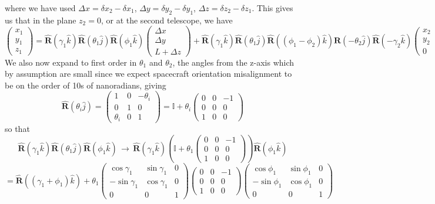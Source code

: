 \documentclass[11pt]{amsart}
\makeatletter
\newcommand{\op}[1]{\mathbf{\hat{#1}}}	%
\newcommand{\se}[1]{\mathbb{#1}}		%
\newcommand{\0}{\varnothing}		%
\DeclareMathOperator*{\goes}{\, \longrightarrow \,}		%
\newcommand{\1}{!}
\newcommand{\2}{@}
\newcommand{\3}{\#}
\newcommand{\4}{\$}
\newcommand{\5}{\%}
\newcommand{\6}{$^\wedge$}
\newcommand{\7}{\&}
\newcommand{\8}{*}
\newcommand{\9}{(}
\makeatother
\begin{document}
where we have used
$\Delta x = \delta x_2 - \delta x_1$, $\Delta y = \delta y_2 - \delta y_1$, $\Delta z = \delta z_2 - \delta z_1$.
This gives us that in the plane $z_2 = 0$, or at the second telescope, we have
\[
\begin{pmatrix}
x_1\\y_1\\z_1
\end{pmatrix}
=\op{R}(\gamma_1\hat{k})\op{R}(\theta_1\hat{j})\op{R}(\phi_1\hat{k})\begin{pmatrix}\Delta x\\\Delta y\\ L+\Delta z\end{pmatrix} + \op{R}(\gamma_1\hat{k})\op{R}(\theta_1\hat{j})\op{R}((\phi_1-\phi_2)\hat{k})\op{R}(-\theta_2\hat{j})\op{R}(-\gamma_2\hat{k})\begin{pmatrix}
x_2
\\
y_2
\\
0
\end{pmatrix}
\]
We also now expand to first order in $\theta_1$ and $\theta_2$, the angles from the z-axis which by assumption are small since we expect spacecraft orientation misalignment to be on the order of 10s of nanoradians, giving
\[
\op{R}(\theta_i \hat{j} ) = \begin{pmatrix} 
1 & 0 & -\theta_i\\ 0 & 1 & 0\\ \theta_i & 0 & 1\end{pmatrix} = \se{I} + \theta_i\begin{pmatrix}0 & 0&-1\\0 & 0 & 0\\ 1 & 0 & 0\end{pmatrix}
\]
so that
\[
\op{R}(\gamma_1\hat{k})\op{R}(\theta_1\hat{j})\op{R}(\phi_1\hat{k})\goes \op{R}(\gamma_1\hat{k})\left(\se{I}+\theta_1\begin{pmatrix}0&0&-1\\0&0&0\\1&0&0\end{pmatrix}\right)\op{R}(\phi_1\hat{k})
\]
\[
=\op{R}\left((\gamma_1+\phi_1)\hat{k}\right)+\theta_1
\begin{pmatrix}
\cos \gamma_1 & \sin \gamma_1 & 0
\\
-\sin \gamma_1 &\cos \gamma_1 &0
\\
 0 & 0 & 1
\end{pmatrix}
\begin{pmatrix}
0&0&-1
\\
0&0&0
\\
1&0&0
\end{pmatrix}
\begin{pmatrix}
\cos \phi_1 & \sin \phi_1 & 0
\\
-\sin \phi_1 &\cos \phi_1 &0
\\
 0 & 0 & 1
\end{pmatrix}
\]
\end{document}
